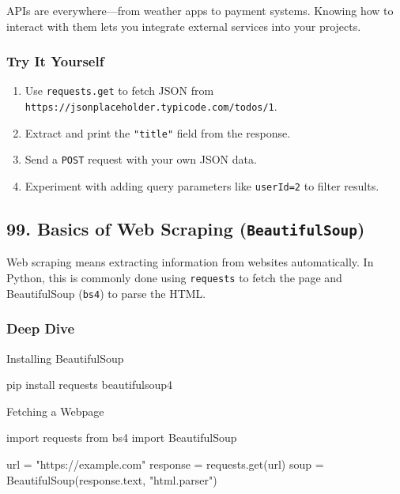 \documentclass[
  letterpaper,
  DIV=11,
  numbers=noendperiod]{scrreprt}
\newenvironment{Shaded}{\begin{snugshade}}{\end{snugshade}}
\newcommand{\ExtensionTok}[1]{\textcolor[rgb]{0.00,0.23,0.31}{#1}}
\newcommand{\ImportTok}[1]{\textcolor[rgb]{0.00,0.46,0.62}{#1}}
\newcommand{\NormalTok}[1]{\textcolor[rgb]{0.00,0.23,0.31}{#1}}
\newcommand{\OperatorTok}[1]{\textcolor[rgb]{0.37,0.37,0.37}{#1}}
\newcommand{\StringTok}[1]{\textcolor[rgb]{0.13,0.47,0.30}{#1}}
\providecommand{\tightlist}{%
  \setlength{\itemsep}{0pt}\setlength{\parskip}{0pt}}
\begin{document}
APIs are everywhere---from weather apps to payment systems. Knowing how
to interact with them lets you integrate external services into your
projects.

\subsubsection{Try It Yourself}\label{try-it-yourself-97}

\begin{enumerate}
\def\labelenumi{\arabic{enumi}.}
\tightlist
\item
  Use \texttt{requests.get} to fetch JSON from
  \texttt{https://jsonplaceholder.typicode.com/todos/1}.
\item
  Extract and print the \texttt{"title"} field from the response.
\item
  Send a \texttt{POST} request with your own JSON data.
\item
  Experiment with adding query parameters like \texttt{userId=2} to
  filter results.
\end{enumerate}

\subsection{\texorpdfstring{99. Basics of Web Scraping
(\texttt{BeautifulSoup})}{99. Basics of Web Scraping (BeautifulSoup)}}\label{basics-of-web-scraping-beautifulsoup}

Web scraping means extracting information from websites automatically.
In Python, this is commonly done using \texttt{requests} to fetch the
page and BeautifulSoup (\texttt{bs4}) to parse the HTML.

\subsubsection{Deep Dive}\label{deep-dive-98}

Installing BeautifulSoup

\begin{Shaded}
\begin{Highlighting}[]
\ExtensionTok{pip}\NormalTok{ install requests beautifulsoup4}
\end{Highlighting}
\end{Shaded}

Fetching a Webpage

\begin{Shaded}
\begin{Highlighting}[]
\ImportTok{import}\NormalTok{ requests}
\ImportTok{from}\NormalTok{ bs4 }\ImportTok{import}\NormalTok{ BeautifulSoup}

\NormalTok{url }\OperatorTok{=} \StringTok{"https://example.com"}
\NormalTok{response }\OperatorTok{=}\NormalTok{ requests.get(url)}
\NormalTok{soup }\OperatorTok{=}\NormalTok{ BeautifulSoup(response.text, }\StringTok{"html.parser"}\NormalTok{)}
\end{Highlighting}
\end{Shaded}
\end{document}
